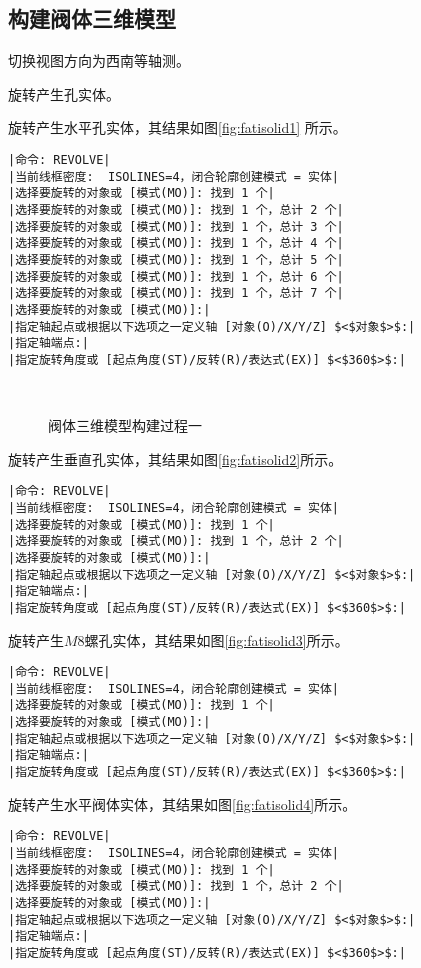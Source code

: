\subsection{构建阀体三维模型}
\begin{procedure}
\item 切换视图方向为西南等轴测。
\item 旋转产生孔实体。

旋转产生水平孔实体，其结果如图\ref{fig:fatisolid1} 所示。
\begin{lstlisting}
|命令: REVOLVE|
|当前线框密度:  ISOLINES=4，闭合轮廓创建模式 = 实体|
|选择要旋转的对象或 [模式(MO)]: 找到 1 个|
|选择要旋转的对象或 [模式(MO)]: 找到 1 个，总计 2 个|
|选择要旋转的对象或 [模式(MO)]: 找到 1 个，总计 3 个|
|选择要旋转的对象或 [模式(MO)]: 找到 1 个，总计 4 个|
|选择要旋转的对象或 [模式(MO)]: 找到 1 个，总计 5 个|
|选择要旋转的对象或 [模式(MO)]: 找到 1 个，总计 6 个|
|选择要旋转的对象或 [模式(MO)]: 找到 1 个，总计 7 个|
|选择要旋转的对象或 [模式(MO)]:|
|指定轴起点或根据以下选项之一定义轴 [对象(O)/X/Y/Z] $<$对象$>$:|
|指定轴端点:|
|指定旋转角度或 [起点角度(ST)/反转(R)/表达式(EX)] $<$360$>$:|
\end{lstlisting}
\begin{figure}[htbp]
\centering
{}\hspace{30pt}
\\
\hspace{30pt}
\caption{阀体三维模型构建过程一}
\end{figure}
旋转产生垂直孔实体，其结果如图\ref{fig:fatisolid2}所示。
\begin{lstlisting}
|命令: REVOLVE|
|当前线框密度:  ISOLINES=4，闭合轮廓创建模式 = 实体|
|选择要旋转的对象或 [模式(MO)]: 找到 1 个|
|选择要旋转的对象或 [模式(MO)]: 找到 1 个，总计 2 个|
|选择要旋转的对象或 [模式(MO)]:|
|指定轴起点或根据以下选项之一定义轴 [对象(O)/X/Y/Z] $<$对象$>$:|
|指定轴端点:|
|指定旋转角度或 [起点角度(ST)/反转(R)/表达式(EX)] $<$360$>$:|
\end{lstlisting}
旋转产生$M8$螺孔实体，其结果如图\ref{fig:fatisolid3}所示。
\begin{lstlisting}
|命令: REVOLVE|
|当前线框密度:  ISOLINES=4，闭合轮廓创建模式 = 实体|
|选择要旋转的对象或 [模式(MO)]: 找到 1 个|
|选择要旋转的对象或 [模式(MO)]:|
|指定轴起点或根据以下选项之一定义轴 [对象(O)/X/Y/Z] $<$对象$>$:|
|指定轴端点:|
|指定旋转角度或 [起点角度(ST)/反转(R)/表达式(EX)] $<$360$>$:|
\end{lstlisting}
旋转产生水平阀体实体，其结果如图\ref{fig:fatisolid4}所示。
\begin{lstlisting}
|命令: REVOLVE|
|当前线框密度:  ISOLINES=4，闭合轮廓创建模式 = 实体|
|选择要旋转的对象或 [模式(MO)]: 找到 1 个|
|选择要旋转的对象或 [模式(MO)]: 找到 1 个，总计 2 个|
|选择要旋转的对象或 [模式(MO)]:|
|指定轴起点或根据以下选项之一定义轴 [对象(O)/X/Y/Z] $<$对象$>$:|
|指定轴端点:|
|指定旋转角度或 [起点角度(ST)/反转(R)/表达式(EX)] $<$360$>$:|
\end{lstlisting}


\end{procedure}

